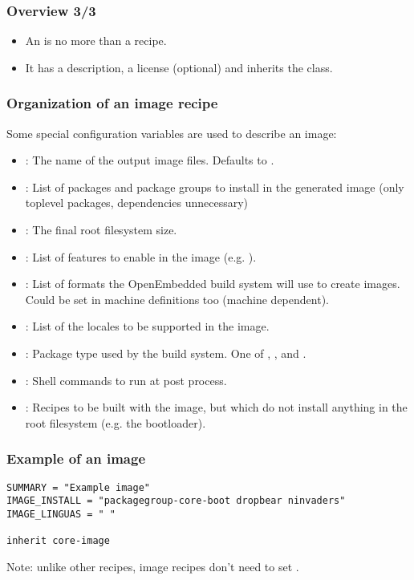 \begin{frame}
  \frametitle{Overview 3/3}
  \begin{itemize}
    \item An  is no more than a recipe.
    \item It has a description, a license (optional) and inherits the
       class.
  \end{itemize}
\end{frame}

\begin{frame}
  \frametitle{Organization of an image recipe}
  Some special configuration variables are used to describe an image:
      \begin{itemize}
        \item {}: The name of the output image files.
          Defaults to .
        \item {}: List of packages and package groups to
          install in the generated image (only toplevel packages, dependencies unnecessary)
        \item {}: The final root filesystem size.
        \item {}: List of features to enable in the
          image (e.g. ).
        \item {}: List of formats the OpenEmbedded build
          system will use to create images. Could be set in machine
          definitions too (machine dependent).
        \item {}: List of the locales to be supported in
          the image.
        \item {}: Package type used by the build system.
          One of , ,  and .
        \item {}: Shell commands to run at
          post process.
        \item {}: Recipes to be built with the image, but
          which do not install anything in the root filesystem
          (e.g. the bootloader).
      \end{itemize}
\end{frame}

\begin{frame}[fragile]
  \frametitle{Example of an image}
  \begin{block}{}
    \begin{verbatim}
SUMMARY = "Example image"
IMAGE_INSTALL = "packagegroup-core-boot dropbear ninvaders"
IMAGE_LINGUAS = " "

inherit core-image
    \end{verbatim}
  \end{block}
  Note: unlike other recipes, image recipes don't need to set
  .
\end{frame}

